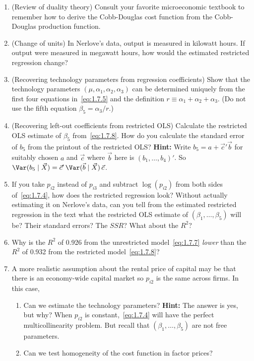\begin{enumerate}
\item (Review of duality theory) Consult your favorite microeconomic textbook to
  remember how to derive the Cobb-Douglas cost function from the Cobb-Douglas
  production function.

\item (Change of units) In Nerlove's data, output is measured in kilowatt hours.
  If output were measured in megawatt hours, how would the estimated restricted
  regression change?

\item (Recovering technology parameters from regression coefficients) Show that the
  technology parameters $(\mu, \alpha_1, \alpha_2, \alpha_3)$ can be determined uniquely
  from the first four equations in~\eqref{eq:1.7.5} and the definition
  $r \equiv \alpha_1 + \alpha_2 + \alpha_3$.  (Do not use the fifth equation
  $\beta_5 = \alpha_3/r$.)

\item (Recovering left-out coefficients from restricted OLS) Calculate the restricted
  OLS estimate of $\beta_5$ from~\eqref{eq:1.7.8}.  How do you calculate the standard
  error of $b_5$ from the printout of the restricted OLS?  \textbf{Hint:} Write
  $b_5 = a + \vec{c}'\vec{b}$ for suitably chosen $a$ and $\vec{c}$ where $\vec{b}$
  here is $(b_1, \ldots, b_4)'$.  So
  $\Var(b_5 \mid \vec{X}) = \vec{c}'\,\Var(\vec{b} \mid \vec{X})\,\vec{c}$.

\item If you take $p_{i2}$ instead of $p_{i3}$ and subtract $\log(p_{i2})$ from both
  sides of~\eqref{eq:1.7.4}, how does the restricted regression look?  Without actually
  estimating it on Nerlove's data, can you tell from the estimated restricted regression
  in the text what the restricted OLS estimate of $(\beta_1, \ldots, \beta_5)$ will be?
  Their standard errors?  The $SSR$?  What about the $R^2$?

\item Why is the $R^2$ of 0.926 from the unrestricted model~\eqref{eq:1.7.7}
  \emph{lower} than the $R^2$ of 0.932 from the restricted model~\eqref{eq:1.7.8}?

\item A more realistic assumption about the rental price of capital may be that there is
  an economy-wide capital market so $p_{i2}$ is the same across firms.  In this case,
  \begin{enumerate}[label=(\alph*)]
  \item Can we estimate the technology parameters?  \textbf{Hint:} The answer is yes, but
    why?  When $p_{i2}$ is constant,~\eqref{eq:1.7.4} will have the perfect
    multicollinearity problem.  But recall that $(\beta_1, \ldots, \beta_5)$ are not free
    parameters.
  \item Can we test homogeneity of the cost function in factor prices?
  \end{enumerate}


\end{enumerate}
